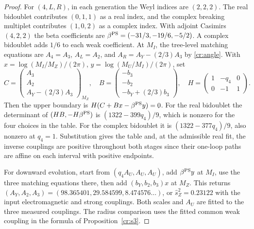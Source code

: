 \documentclass[aps,pra,onecolumn,superscriptaddress,nofootinbib,10pt]{revtex4-2}
\theoremstyle{definition}
\theoremstyle{remark}
\begin{document}
\begin{proof}
For $(4,L,R)$, in each generation the Weyl indices are $(2,2,2)$.
The real bidoublet contributes $(0,1,1)$ as a real index,
and the complex breaking multiplet contributes $(1,0,2)$ as a
complex index. With adjoint Casimirs $(4,2,2)$ the beta
coefficients are $\beta^{\rm PS}=(-31/3,-19/6,-5/2)$.
A complex bidoublet adds $1/6$ to each weak coefficient.
At $M_I$, the tree-level matching equations are
$A_4=A_3$, $A_L=A_2$, and $A_R=A_Y-(2/3)A_3$ by
\eqref{cr:angle}. With $x=\log(M_I/M_Z)/(2\pi)$,
$y=\log(M_U/M_I)/(2\pi)$, set
\[
 C=\begin{pmatrix} A_3\\ A_2\\ A_Y-(2/3)A_3\end{pmatrix}_{M_Z},
 \quad
 B=\begin{pmatrix}-b_3\\-b_2\\-b_Y+(2/3)b_3\end{pmatrix},
 \quad
 H=\begin{pmatrix}1&-q_4&0\\0&-1&1\end{pmatrix}.
\]
Then the upper boundary is $H(C+Bx-\beta^{\rm PS}y)=0$.
For the real bidoublet the determinant of
$(HB,-H\beta^{\rm PS})$ is $(1322-399q_4)/9$,
which is nonzero for the four choices in the table.
For the complex bidoublet it is $(1322-377q_4)/9$,
also nonzero at $q_4=1$. Substitution gives the table
and, at the admissible real fit, the inverse couplings
are positive throughout both stages since their one-loop
paths are affine on each interval with positive endpoints.

For downward evolution, start from $(q_4 A_U,A_U,A_U)$,
add $\beta^{\rm PS} y$ at $M_I$, use the three matching
equations there, then add $(b_Y,b_2,b_3)x$ at $M_Z$.
This returns $(A_Y,A_2,A_3)=(98.365401,29.584599,8.474576\ldots)$,
or $\hat s_Z^2=0.23122$ with the input electromagnetic and strong
couplings. Both scales and $A_U$ are fitted to the three measured
couplings.
The radius comparison uses the fitted common weak coupling in
the formula of Proposition~\ref{cr:s3}.
\end{proof}
\end{document}
